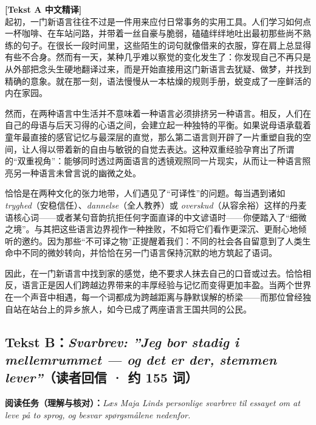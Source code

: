 \begin{transbox}
\small
\textbf{\color{NCDTeal}[Tekst A 中文精译]}\\
起初，一门新语言往往不过是一件用来应付日常事务的实用工具。人们学习如何点一杯咖啡、在车站问路，并带着一丝自豪与脆弱，磕磕绊绊地吐出最初那些尚不熟练的句子。在很长一段时间里，这些陌生的词句就像借来的衣服，穿在肩上总显得有些不合身。然而有一天，某种几乎难以察觉的变化发生了：你发现自己不再只是从外部把念头生硬地翻译过来，而是开始直接用这门新语言去犹疑、做梦，并找到精确的意象。就在那一刻，语法慢慢从一本枯燥的规则手册，蜕变成了一座鲜活的内在家园。

然而，在两种语言中生活并不意味着一种语言必须排挤另一种语言。相反，人们在自己的母语与后天习得的心语之间，会建立起一种独特的平衡。如果说母语承载着童年最直接的感官记忆与最深层的直觉，那么第二语言则开辟了一片重塑自我的空间，让人得以带着新的自由与敏锐的自觉去表达。这种双重经验孕育出了所谓的“双重视角”：能够同时透过两面语言的透镜观照同一片现实，从而让一种语言照亮另一种语言未曾言说的幽微之处。

恰恰是在两种文化的张力地带，人们遇见了“可译性”的问题。每当遇到诸如 \textit{tryghed}（安稳信任）、\textit{dannelse}（全人教养）或 \textit{overskud}（从容余裕）这样的丹麦语核心词——或者某句音韵抗拒任何字面直译的中文谚语时——你便踏入了“细微之境”。与其把这些语言边界视作一种挫败，不如将它们看作更深沉、更耐心地倾听的邀约。因为那些“不可译之物”正提醒着我们：不同的社会各自留意到了人类生命中不同的微妙转向，并恰恰在另一门语言保持沉默的地方筑起了语词。

因此，在一门新语言中找到家的感觉，绝不要求人抹去自己的口音或过去。恰恰相反，语言正是因人们跨越边界带来的丰厚经验与记忆而变得更加丰盈。当两个世界在一个声音中相遇，每一个词都成为跨越距离与静默误解的桥梁——而那位曾经独自站在站台上的异乡旅人，如今已成了两座语言王国共同的公民。
\end{transbox}

\subsection*{Tekst B：\textit{Svarbrev: ”Jeg bor stadig i mellemrummet --- og det er der, stemmen lever”}（读者回信 · 约 155 词）}

\textbf{阅读任务（理解与核对）：}\textit{Læs Maja Linds personlige svarbrev til essayet om at leve på to sprog, og besvar spørgsmålene nedenfor.}

